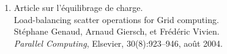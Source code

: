 \documentclass[11pt]{article}
\begin{document}
\begin{enumerate}
\item Article sur l'équilibrage de charge.\\
Load-balancing scatter operations for Grid computing.\\
Stéphane Genaud, Arnaud Giersch, et Frédéric Vivien.\\
{\em Parallel Computing}, Elsevier, 30(8):923--946, août 2004.\\


\end{enumerate}




\end{document}
